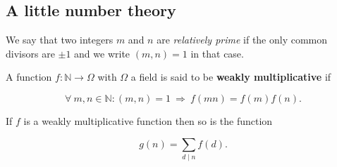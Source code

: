  \subsection{A little number theory}

We say that two integers $m$ and $n$ are \textit{relatively prime} if the only common divisors are $\pm 1$ and we write $(m, n) = 1$ in that case.

\begin{defn}
A function $f:\mathbb{N} \rightarrow \Omega$ with $\Omega$ a field is said to be \textbf{weakly multiplicative} if

\[
	\forall \ m, n \in \mathbb{N}: (m, n) = 1 \ \Rightarrow \ f(mn) = f(m) f(n).
\]
\end{defn}

\begin{thm}
If $f$ is a weakly multiplicative function then so is the function

\[
	g(n) = \sum_{d \mid n} f(d).
\]
\end{thm}

